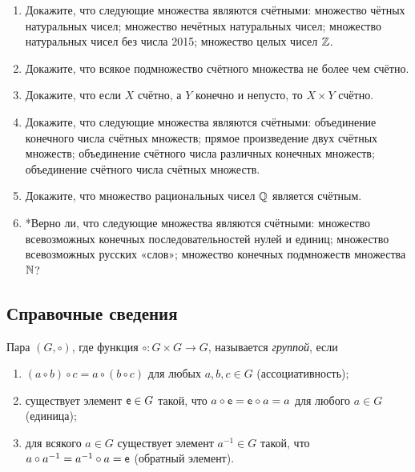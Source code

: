 \begin{enumerate}
\item Докажите, что следующие множества являются счётными:
\ipunkt множество чётных натуральных чисел;
\ipunkt множество нечётных натуральных чисел;
\ipunkt множество натуральных чисел без числа 2015;
\ipunkt множество целых чисел $\mathbb Z$.

\item Докажите, что всякое подмножество счётного множества не более чем счётно.

\item Докажите, что если $X$ счётно, а $Y$ конечно и непусто, то $X \times Y$ счётно.

\item Докажите, что следующие множества являются счётными:
\ipunkt объединение конечного числа счётных множеств;
\ipunkt прямое произведение двух счётных множеств;
\ipunkt объединение счётного числа различных конечных множеств;
\ipunkt объединение счётного числа счётных множеств.

\item Докажите, что множество рациональных чисел $\mathbb Q$ является счётным.

\item *Верно ли, что следующие множества являются счётными:
\ipunkt множество всевозможных конечных последовательностей нулей и единиц;
\ipunkt множество всевозможных русских «слов»;
\ipunkt множество конечных подмножеств множества $\mathbb N$?
\end{enumerate}

\subsection*{Справочные сведения}

Пара $(G,\circ)$, где функция $\circ:G\times G\to G$, называется \textit{группой}, если
\begin{enumerate}
\item $(a\circ b)\circ c = a\circ (b\circ c)$ для любых $a,b,c\in G$ (ассоциативность);
\item существует элемент $\mathsf e\in G$ такой, что $a\circ \mathsf e=\mathsf e\circ a=a$ для любого $a\in G$ (единица);
\item для всякого $a\in G$ существует элемент $a^{-1}\in G$ такой, что $a\circ a^{-1}=a^{-1}\circ a=\mathsf e$ (обратный элемент).
\end{enumerate}

